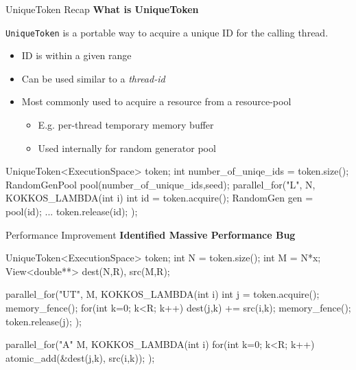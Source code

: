 \begin{frame}[fragile]{UniqueToken Recap}
\textbf{What is UniqueToken}

\vspace{3pt}
\texttt{UniqueToken} is a portable way to acquire a unique ID for the calling thread.

\begin{itemize}
  \item{ID is within a given range}
  \item{Can be used similar to a \textit{thread-id}}
  \item{Most commonly used to acquire a resource from a resource-pool}
  \begin{itemize}
    \item{E.g. per-thread temporary memory buffer}
    \item{Used internally for random generator pool}
  \end{itemize}
\end{itemize}

   \begin{code}[frame=single, keywords={UniqueToken,size,acquire,release}]
    UniqueToken<ExecutionSpace> token;
    int number_of_uniqe_ids = token.size();
    RandomGenPool pool(number_of_unique_ids,seed);
    parallel_for("L", N, KOKKOS_LAMBDA(int i) {
      int id = token.acquire();
      RandomGen gen = pool(id);
      ...
      token.release(id);
    });
   \end{code}

\end{frame}

\begin{frame}[fragile]{Performance Improvement}
\textbf{Identified Massive Performance Bug}

\begin{code}[frame=single, keywords={UniqueToken,size,acquire,release,atomic_add,memory_fence}]
 UniqueToken<ExecutionSpace> token;
 int N = token.size(); int M = N*x;
 View<double**> dest(N,R), src(M,R);

 parallel_for("UT", M, KOKKOS_LAMBDA(int i) {
   int j = token.acquire(); memory_fence();
   for(int k=0; k<R; k++) dest(j,k) += src(i,k);
   memory_fence(); token.release(j);
 });

 parallel_for("A" M, KOKKOS_LAMBDA(int i) {
   for(int k=0; k<R; k++) atomic_add(&dest(j,k), src(i,k));
 });
\end{code}

\end{frame}

